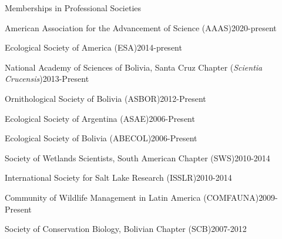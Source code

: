 \documentclass{resume} %
\begin{document}
\begin{rSection}{Memberships in Professional Societies}
\begin{esSubsection}{American Association for the Advancement of Science }{(AAAS)}{2020-present}{}{}
\end{esSubsection}

\begin{esSubsection}{Ecological Society of America }{(ESA)}{2014-present}{}{}
\end{esSubsection}

\begin{esSubsection}{National Academy of Sciences of Bolivia, Santa Cruz Chapter }{({\em Scientia Crucensis})}{2013-Present}{}{}
\end{esSubsection}


\begin{esSubsection}{Ornithological Society of Bolivia }{(ASBOR)}{2012-Present}{}{}
\end{esSubsection}

\begin{esSubsection}{Ecological Society of Argentina }{(ASAE)}{2006-Present}{}{}
\end{esSubsection}

\begin{esSubsection}{Ecological Society of Bolivia }{(ABECOL)}{2006-Present}{}{}
\end{esSubsection}

\begin{esSubsection}{Society of Wetlands Scientists, South American Chapter }{(SWS)}{2010-2014}{}{}
\end{esSubsection}

\begin{esSubsection}{International Society for Salt Lake Research }{(ISSLR)}{2010-2014}{}{}
\end{esSubsection}

\begin{esSubsection}{Community of Wildlife Management in Latin America }{(COMFAUNA)}{2009-Present}{}{}
\end{esSubsection}

\begin{esSubsection}{Society of Conservation Biology, Bolivian Chapter }{(SCB)}{2007-2012}{}{}
\end{esSubsection}

\end{rSection}



\clearpage
\end{document}
